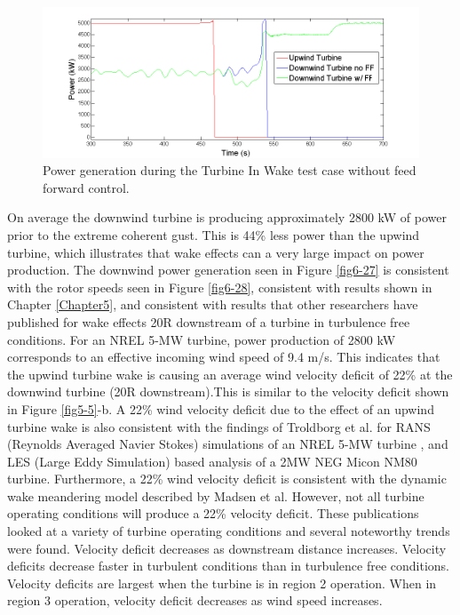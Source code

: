 \begin{figure}[ht] 
	\centering
		\includegraphics[width = \linewidth]{Figures/ch6Figures/fig6-29.png}

	\caption{Power generation during the Turbine In Wake test case without feed forward control.}
	\label{fig6-29}
\end{figure}

On average the downwind turbine is producing approximately 2800 kW of power prior to the extreme coherent gust. This is 44\% less power than the upwind turbine, which illustrates that wake effects can a very large impact on power production. The downwind power generation seen in Figure \ref{fig6-27} is consistent with the rotor speeds seen in Figure \ref{fig6-28}, consistent with results shown in Chapter \ref{Chapter5}, and consistent with results that other researchers have published for wake effects 20R downstream of a turbine in turbulence free conditions. For an NREL 5-MW turbine, power production of 2800 kW corresponds to an effective incoming wind speed of 9.4 m/s. This indicates that the upwind turbine wake is causing an average wind velocity deficit of 22\%  at the downwind turbine (20R downstream).This is similar to the velocity deficit shown in Figure \ref{fig5-5}-b. A 22\% wind velocity deficit due to the effect of an upwind turbine wake is also consistent with the findings of Troldborg et al. for RANS (Reynolds Averaged Navier Stokes) simulations of an NREL 5-MW turbine \cite{troldborg2015}, and LES (Large Eddy Simulation) based analysis of a 2MW NEG Micon NM80 turbine.\cite{troldborg2010} Furthermore, a 22\% wind velocity deficit is consistent with the dynamic wake meandering model described by Madsen et al.\cite{madsen2010} However, not all turbine operating conditions will produce a 22\% velocity deficit. These publications looked at a variety of turbine operating conditions and several noteworthy trends were found. Velocity deficit decreases as downstream distance increases. Velocity deficits decrease faster in turbulent conditions than in turbulence free conditions. Velocity deficits are largest when the turbine is in region 2 operation. When in region 3 operation, velocity deficit decreases as wind speed increases.


